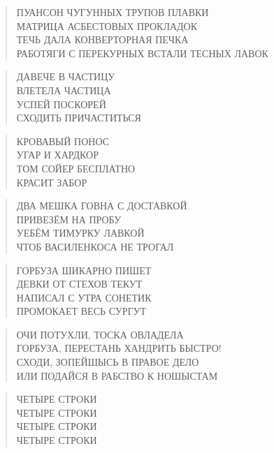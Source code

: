 \poemtitle{***}
\begin{verse}
ПУАНСОН ЧУГУННЫХ ТРУПОВ ПЛАВКИ\\
МАТРИЦА АСБЕСТОВЫХ ПРОКЛАДОК\\
ТЕЧЬ ДАЛА КОНВЕРТОРНАЯ ПЕЧКА\\
РАБОТЯГИ С ПЕРЕКУРНЫХ ВСТАЛИ ТЕСНЫХ ЛАВОК
\end{verse}

\poemtitle{***}
\begin{verse}
ДАВЕЧЕ  В ЧАСТИЦУ \\
ВЛЕТЕЛА ЧАСТИЦА\\
УСПЕЙ ПОСКОРЕЙ \\
СХОДИТЬ ПРИЧАСТИТЬСЯ
\end{verse}

\poemtitle{***}
\begin{verse}
КРОВАВЫЙ ПОНОС\\
УГАР И ХАРДКОР\\
ТОМ СОЙЕР БЕСПЛАТНО\\
КРАСИТ ЗАБОР
\end{verse}

\poemtitle{***}
\begin{verse}
ДВА МЕШКА ГОВНА С ДОСТАВКОЙ\\
ПРИВЕЗЁМ НА ПРОБУ\\
УЕБЁМ ТИМУРКУ ЛАВКОЙ\\
ЧТОБ ВАСИЛЕНКОСА НЕ ТРОГАЛ
\end{verse}

\poemtitle{***}
\begin{verse}
ГОРБУЗА ШИКАРНО ПИШЕТ\\
ДЕВКИ ОТ СТЕХОВ ТЕКУТ\\
НАПИСАЛ С УТРА СОНЕТИК\\
ПРОМОКАЕТ ВЕСЬ СУРГУТ
\end{verse}

\poemtitle{***}
\begin{verse}
ОЧИ ПОТУХЛИ, ТОСКА ОВЛАДЕЛА\\
ГОРБУЗА, ПЕРЕСТАНЬ ХАНДРИТЬ БЫСТРО!\\
СХОДИ, ЗОПЕЙШЫСЬ В ПРАВОЕ ДЕЛО\\
ИЛИ ПОДАЙСЯ В РАБСТВО К НОШЫСТАМ
\end{verse}

\poemtitle{***}
\begin{verse}
ЧЕТЫРЕ СТРОКИ\\
ЧЕТЫРЕ СТРОКИ\\
ЧЕТЫРЕ СТРОКИ\\
ЧЕТЫРЕ СТРОКИ
\end{verse}

